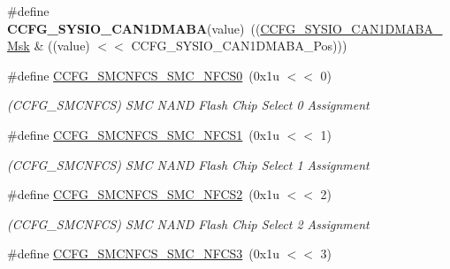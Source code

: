 \begin{DoxyCompactItemize}
\mbox{\label{group__SAME70__MATRIX_gad0671a98f0a3f129dca2131fa12a4da3}} 
\#define {\bfseries C\+C\+F\+G\+\_\+\+S\+Y\+S\+I\+O\+\_\+\+C\+A\+N1\+D\+M\+A\+BA}(value)~((\mbox{\hyperlink{group__SAMV71__MATRIX_ga2c89fbda7d21b335d5be42d5dd6c6ce7}{C\+C\+F\+G\+\_\+\+S\+Y\+S\+I\+O\+\_\+\+C\+A\+N1\+D\+M\+A\+B\+A\+\_\+\+Msk}} \& ((value) $<$$<$ C\+C\+F\+G\+\_\+\+S\+Y\+S\+I\+O\+\_\+\+C\+A\+N1\+D\+M\+A\+B\+A\+\_\+\+Pos)))
\item 
\mbox{\label{group__SAME70__MATRIX_gabd95ec8866de0fb2ae4d7c7bccfa0f01}} 
\#define \mbox{\hyperlink{group__SAME70__MATRIX_gabd95ec8866de0fb2ae4d7c7bccfa0f01}{C\+C\+F\+G\+\_\+\+S\+M\+C\+N\+F\+C\+S\+\_\+\+S\+M\+C\+\_\+\+N\+F\+C\+S0}}~(0x1u $<$$<$ 0)
\begin{DoxyCompactList}\small\item\em (C\+C\+F\+G\+\_\+\+S\+M\+C\+N\+F\+CS) S\+MC N\+A\+ND Flash Chip Select 0 Assignment \end{DoxyCompactList}\item 
\mbox{\label{group__SAME70__MATRIX_gadc59188f4e84386939f05c38eef900b1}} 
\#define \mbox{\hyperlink{group__SAME70__MATRIX_gadc59188f4e84386939f05c38eef900b1}{C\+C\+F\+G\+\_\+\+S\+M\+C\+N\+F\+C\+S\+\_\+\+S\+M\+C\+\_\+\+N\+F\+C\+S1}}~(0x1u $<$$<$ 1)
\begin{DoxyCompactList}\small\item\em (C\+C\+F\+G\+\_\+\+S\+M\+C\+N\+F\+CS) S\+MC N\+A\+ND Flash Chip Select 1 Assignment \end{DoxyCompactList}\item 
\mbox{\label{group__SAME70__MATRIX_ga1cd07efe97528a43e07007a05c44fe7a}} 
\#define \mbox{\hyperlink{group__SAME70__MATRIX_ga1cd07efe97528a43e07007a05c44fe7a}{C\+C\+F\+G\+\_\+\+S\+M\+C\+N\+F\+C\+S\+\_\+\+S\+M\+C\+\_\+\+N\+F\+C\+S2}}~(0x1u $<$$<$ 2)
\begin{DoxyCompactList}\small\item\em (C\+C\+F\+G\+\_\+\+S\+M\+C\+N\+F\+CS) S\+MC N\+A\+ND Flash Chip Select 2 Assignment \end{DoxyCompactList}\item 
\mbox{\label{group__SAME70__MATRIX_ga09bdc6a5dde71677033a4644f0746969}} 
\#define \mbox{\hyperlink{group__SAME70__MATRIX_ga09bdc6a5dde71677033a4644f0746969}{C\+C\+F\+G\+\_\+\+S\+M\+C\+N\+F\+C\+S\+\_\+\+S\+M\+C\+\_\+\+N\+F\+C\+S3}}~(0x1u $<$$<$ 3)
$$
\end{DoxyCompactItemize}
